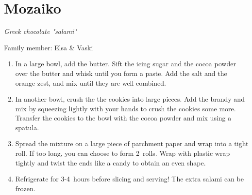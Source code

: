 \chapter{Mozaiko}
\label{ch:mozaiko}



\textit{Greek chocolate "salami"}

Family member: Elsa \& Vaski

\begin{enumerate}
    \item In a large bowl, add the butter. Sift the icing sugar and the cocoa powder over the butter and whisk until you form a paste. Add the salt and the orange zest, and mix until they are well combined.
    \item In another bowl, crush the the cookies into large pieces. Add the brandy and mix by squeezing lightly with your hands to crush the cookies some more. Transfer the cookies to the bowl with the cocoa powder and mix using a spatula.
    \item Spread the mixture on a large piece of parchment paper and wrap into a tight roll. If too long, you can choose to form 2~rolls. Wrap with plastic wrap tightly and twist the ends like a candy to obtain an even shape.
    \item Refrigerate for 3-4~hours before slicing and serving! The extra salami can be frozen.
\end{enumerate}
